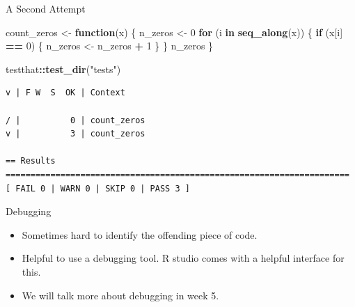 \documentclass[
  ignorenonframetext,
  aspectratio=1610,
  onlytextwidth]{beamer}
\newenvironment{Shaded}{\begin{snugshade}}{\end{snugshade}}
\newcommand{\ControlFlowTok}[1]{\textcolor[rgb]{0.13,0.29,0.53}{\textbf{#1}}}
\newcommand{\DecValTok}[1]{\textcolor[rgb]{0.00,0.00,0.81}{#1}}
\newcommand{\FunctionTok}[1]{\textcolor[rgb]{0.13,0.29,0.53}{\textbf{#1}}}
\newcommand{\NormalTok}[1]{#1}
\newcommand{\OtherTok}[1]{\textcolor[rgb]{0.56,0.35,0.01}{#1}}
\newcommand{\SpecialCharTok}[1]{\textcolor[rgb]{0.81,0.36,0.00}{\textbf{#1}}}
\newcommand{\StringTok}[1]{\textcolor[rgb]{0.31,0.60,0.02}{#1}}
\providecommand{\tightlist}{}
\begin{document}
\begin{frame}[fragile]{A Second Attempt}
\label{a-second-attempt}
\begin{Shaded}
\begin{Highlighting}[]
\NormalTok{count\_zeros }\OtherTok{\textless{}{-}} \ControlFlowTok{function}\NormalTok{(x) \{}
\NormalTok{  n\_zeros }\OtherTok{\textless{}{-}} \DecValTok{0}
  \ControlFlowTok{for}\NormalTok{ (i }\ControlFlowTok{in} \FunctionTok{seq\_along}\NormalTok{(x)) \{}
    \ControlFlowTok{if}\NormalTok{ (x[i] }\SpecialCharTok{==} \DecValTok{0}\NormalTok{) \{}
\NormalTok{      n\_zeros }\OtherTok{\textless{}{-}}\NormalTok{ n\_zeros }\SpecialCharTok{+} \DecValTok{1}
\NormalTok{    \}}
\NormalTok{  \}}
\NormalTok{  n\_zeros}
\NormalTok{\}}
\end{Highlighting}
\end{Shaded}

\begin{Shaded}
\begin{Highlighting}[]
\NormalTok{testthat}\SpecialCharTok{::}\FunctionTok{test\_dir}\NormalTok{(}\StringTok{"tests"}\NormalTok{)}
\end{Highlighting}
\end{Shaded}

\begin{verbatim}
v | F W  S  OK | Context

/ |          0 | count_zeros                                                    
v |          3 | count_zeros

== Results =====================================================================
[ FAIL 0 | WARN 0 | SKIP 0 | PASS 3 ]
\end{verbatim}
\end{frame}

\begin{frame}{Debugging}
\label{debugging}
\begin{itemize}
\tightlist
\item
  Sometimes hard to identify the offending piece of code.
\item
  Helpful to use a debugging tool. R studio comes with a helpful
  interface for this.
\item
  We will talk more about debugging in week 5.
\end{itemize}
\end{frame}
\end{document}
